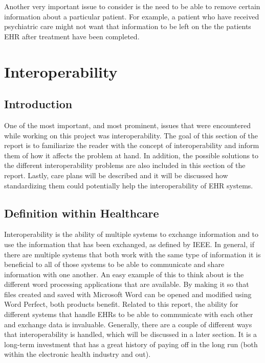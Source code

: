 \documentclass[14pt]{article}
\begin{document}
Another very important issue to consider is the need to be able to remove certain information about a particular patient. For example, a patient who have received psychiatric care might not want that information to be left on the the patients \gls{EHR} after treatment have been completed\cite{EPJ1}.


\newpage

\section{Interoperability}
\label{sec:Interoperability}

\subsection{Introduction} 

One of the most important, and most prominent, issues that were encountered while working on this project was interoperability.  The goal of this section of the report is to familiarize the reader with the concept of interoperability and inform them of how it affects the problem at hand.  In addition, the possible solutions to the different interoperability problems are also included in this section of the report.  Lastly, care plans will be described and it will be discussed how standardizing them could potentially help the interoperability of \gls{EHR} systems.

\subsection{Definition within Healthcare} 



Interoperability is the ability of multiple systems to exchange information and to use the information that has been exchanged, as defined by \gls{IEEE}.  In general, if there are multiple systems that both work with the same type of information it is beneficial to all of those systems to be able to communicate and share information with one another.  An easy example of this to think about is the different word processing applications that are available.  By making it so that files created and saved with Microsoft Word can be opened and modified using Word Perfect, both products benefit.  Related to this report, the ability for different systems that handle \glspl{EHR} to be able to communicate with each other and exchange data is invaluable.  Generally, there are a couple of different ways that interoperability is handled, which will be discussed in a later section.  It is a long-term investment that has a great history of paying off in the long run (both within the electronic health industry and out).
\end{document}
